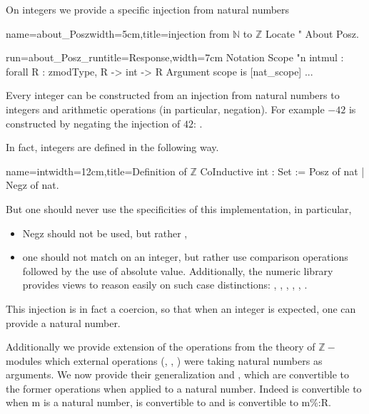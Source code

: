 On integers we provide a specific injection from natural numbers

\begin{coq}{name=about_Posz}{width=5cm,title=injection from $\mathbb{N}$
  to $\mathbb{Z}$}
Locate "%
About Posz.
\end{coq}
\begin{coqout}{run=about_Posz_run}{title=Response,width=7cm}
Notation            Scope     
"n %
intmul : forall R : zmodType, R -> int -> R
Argument scope is [nat_scope] ...
\end{coqout}

Every integer can be constructed from an injection from natural
numbers to integers and arithmetic operations (in particular,
negation).  For example $-42$ is constructed by negating the injection
of $42$: .

In fact, integers are defined in the following way.

\begin{coq}{name=int}{width=12cm,title=Definition of $\mathbb{Z}$}
CoInductive int : Set := Posz of nat | Negz of nat.
\end{coq}

But one should never use the specificities of this implementation, in
particular,
\begin{itemize}
\item Negz should not be used, but rather ,
\item one should not match on an integer, but rather use comparison
  operations \C{_ <= _} followed by the use of absolute
  value. Additionally, the numeric library provides views to reason
  easily on such case distinctions: , , ,
  , , .
\end{itemize}


This injection is in fact a coercion, so that when an integer is
expected, one can provide a natural number.

Additionally we provide extension of the operations from the theory of
$\mathbb{Z}-$modules which external operations (\C{*+}, \C{*-},
) were taking natural numbers as arguments. We now provide
their generalization \C{*~} and , which are convertible to the
former operations when applied to a natural number.
Indeed  is convertible to  when m is a natural
number,  is convertible to  and
 is convertible to {m\%:R}.

